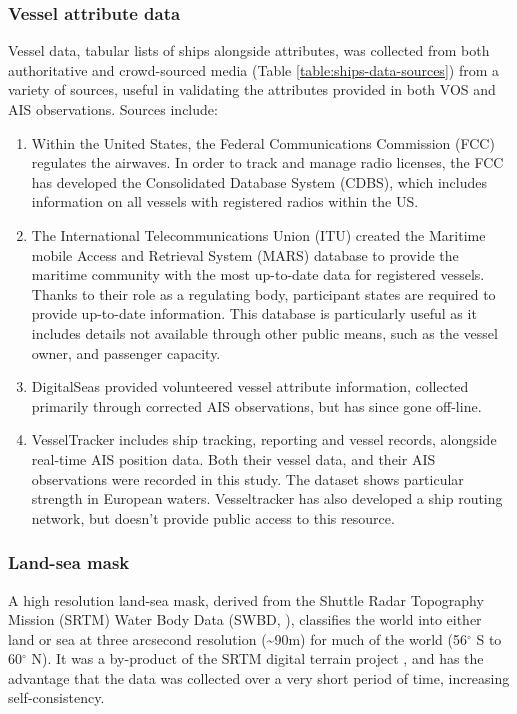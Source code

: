 \subsubsection{Vessel attribute data}
Vessel data, tabular lists of ships alongside attributes, was collected from both authoritative and crowd-sourced media (Table \ref{table:ships-data-sources}) from a variety of sources, useful in validating the attributes provided in both VOS and AIS observations. Sources include:
\begin{enumerate}
  \item Within the United States, the Federal Communications Commission (FCC) regulates the airwaves. In order to track and manage radio licenses, the FCC has developed the Consolidated Database System (CDBS), which includes information on all vessels with registered radios within the US. 
  \item The International Telecommunications Union (ITU) created the Maritime mobile Access and Retrieval System (MARS) database to provide the maritime community with the most up-to-date data for registered vessels. Thanks to their role as a regulating body, participant states are required to provide up-to-date information. This database is particularly useful as it includes details not available through other public means, such as the vessel owner, and passenger capacity.
  \item DigitalSeas provided volunteered vessel attribute information, collected primarily through corrected AIS observations, but has since gone off-line.
  \item VesselTracker includes ship tracking, reporting and vessel records, alongside real-time AIS position data. Both their vessel data, and their AIS observations were recorded in this study. The dataset shows particular strength in European waters. Vesseltracker has also developed a ship routing network, but doesn't provide public access to this resource.
\end{enumerate}

\subsubsection{Land-sea mask}
\label{sec:land-sea-mask}
  A high resolution land-sea mask, derived from the Shuttle Radar Topography Mission (SRTM) Water Body Data (SWBD, \citealp{slater2006srtm}), classifies the world into either land or sea at three arcsecond resolution (\textasciitilde{}90m) for much of the world (56$^\circ$ S to 60$^\circ$ N). It was a by-product of the SRTM digital terrain project \citep{rabus2003shuttle}, and has the advantage that the data was collected over a very short period of time, increasing self-consistency.

